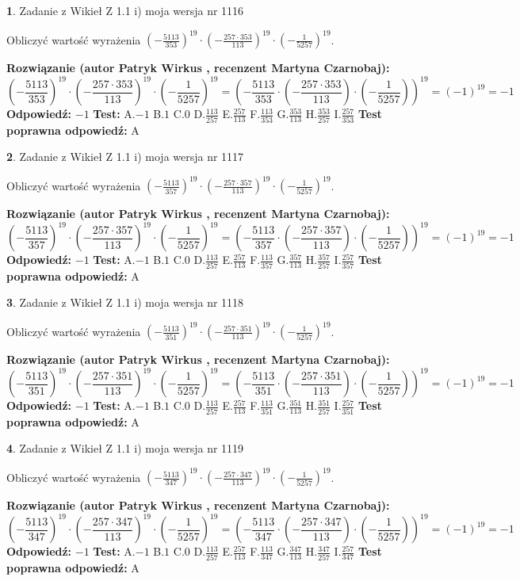 \documentclass[12pt, a4paper]{article}
\theoremstyle{definition} %
\newtheorem{zad}{}
\newcommand{\zadStart}[1]{\begin{zad}#1\newline}
\newcommand{\zadStop}{\end{zad}}
\newcommand{\rozwStart}[2]{\noindent \textbf{Rozwiązanie (autor #1 , recenzent #2): }\newline}
\newcommand{\rozwStop}{\newline}
\newcommand{\odpStart}{\noindent \textbf{Odpowiedź:}\newline}
\newcommand{\odpStop}{\newline}
\newcommand{\testStart}{\noindent \textbf{Test:}\newline}
\newcommand{\testStop}{\newline}
\newcommand{\kluczStart}{\noindent \textbf{Test poprawna odpowiedź:}\newline}
\newcommand{\kluczStop}{\newline}
\begin{document}
\zadStart{Zadanie z Wikieł Z 1.1 i) moja wersja nr 1116}

Obliczyć wartość wyrażenia $(-\frac{5113}{353})^{19} \cdot (-\frac{257 \cdot 353}{113})^{19} \cdot (-\frac{1}{5257})^{19}$.
\zadStop
\rozwStart{Patryk Wirkus}{Martyna Czarnobaj}
$$(-\frac{5113}{353})^{19} \cdot (-\frac{257 \cdot 353}{113})^{19} \cdot (-\frac{1}{5257})^{19} = (-\frac{5113}{353} \cdot (-\frac{257 \cdot 353}{113}) \cdot (-\frac{1}{5257}))^{19} = (-1)^{19} = -1$$
\rozwStop
\odpStart
$-1$
\odpStop
\testStart
A.$-1$ B.$1$ C.$0$ D.$\frac{113}{257}$ E.$\frac{257}{113}$
F.$\frac{113}{353}$ G.$\frac{353}{113}$
H.$\frac{353}{257}$
I.$\frac{257}{353}$
\testStop
\kluczStart
A
\kluczStop



\zadStart{Zadanie z Wikieł Z 1.1 i) moja wersja nr 1117}

Obliczyć wartość wyrażenia $(-\frac{5113}{357})^{19} \cdot (-\frac{257 \cdot 357}{113})^{19} \cdot (-\frac{1}{5257})^{19}$.
\zadStop
\rozwStart{Patryk Wirkus}{Martyna Czarnobaj}
$$(-\frac{5113}{357})^{19} \cdot (-\frac{257 \cdot 357}{113})^{19} \cdot (-\frac{1}{5257})^{19} = (-\frac{5113}{357} \cdot (-\frac{257 \cdot 357}{113}) \cdot (-\frac{1}{5257}))^{19} = (-1)^{19} = -1$$
\rozwStop
\odpStart
$-1$
\odpStop
\testStart
A.$-1$ B.$1$ C.$0$ D.$\frac{113}{257}$ E.$\frac{257}{113}$
F.$\frac{113}{357}$ G.$\frac{357}{113}$
H.$\frac{357}{257}$
I.$\frac{257}{357}$
\testStop
\kluczStart
A
\kluczStop



\zadStart{Zadanie z Wikieł Z 1.1 i) moja wersja nr 1118}

Obliczyć wartość wyrażenia $(-\frac{5113}{351})^{19} \cdot (-\frac{257 \cdot 351}{113})^{19} \cdot (-\frac{1}{5257})^{19}$.
\zadStop
\rozwStart{Patryk Wirkus}{Martyna Czarnobaj}
$$(-\frac{5113}{351})^{19} \cdot (-\frac{257 \cdot 351}{113})^{19} \cdot (-\frac{1}{5257})^{19} = (-\frac{5113}{351} \cdot (-\frac{257 \cdot 351}{113}) \cdot (-\frac{1}{5257}))^{19} = (-1)^{19} = -1$$
\rozwStop
\odpStart
$-1$
\odpStop
\testStart
A.$-1$ B.$1$ C.$0$ D.$\frac{113}{257}$ E.$\frac{257}{113}$
F.$\frac{113}{351}$ G.$\frac{351}{113}$
H.$\frac{351}{257}$
I.$\frac{257}{351}$
\testStop
\kluczStart
A
\kluczStop



\zadStart{Zadanie z Wikieł Z 1.1 i) moja wersja nr 1119}

Obliczyć wartość wyrażenia $(-\frac{5113}{347})^{19} \cdot (-\frac{257 \cdot 347}{113})^{19} \cdot (-\frac{1}{5257})^{19}$.
\zadStop
\rozwStart{Patryk Wirkus}{Martyna Czarnobaj}
$$(-\frac{5113}{347})^{19} \cdot (-\frac{257 \cdot 347}{113})^{19} \cdot (-\frac{1}{5257})^{19} = (-\frac{5113}{347} \cdot (-\frac{257 \cdot 347}{113}) \cdot (-\frac{1}{5257}))^{19} = (-1)^{19} = -1$$
\rozwStop
\odpStart
$-1$
\odpStop
\testStart
A.$-1$ B.$1$ C.$0$ D.$\frac{113}{257}$ E.$\frac{257}{113}$
F.$\frac{113}{347}$ G.$\frac{347}{113}$
H.$\frac{347}{257}$
I.$\frac{257}{347}$
\testStop
\kluczStart
A
\kluczStop
\end{document}
